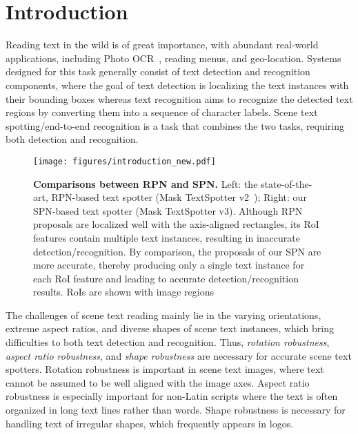 \documentclass[runningheads]{llncs}
\begin{document}
\section{Introduction}\label{sec:introduction}
Reading text in the wild is of great importance, with abundant real-world applications, including Photo OCR~\cite{bissacco2013photoocr}, reading menus, and geo-location. Systems designed for this task generally consist of text detection and recognition components, where the goal of text detection is localizing the text instances with their bounding boxes whereas text recognition aims to recognize the detected text regions by converting them into a sequence of character labels. Scene text spotting/end-to-end recognition is a task that combines the two tasks, requiring both detection and recognition.

\begin{figure}[t]
\centering
\texttt{[image: figures/introduction\_new.pdf]}
\caption{\textbf{Comparisons between RPN and SPN.} Left: the state-of-the-art, RPN-based text spotter (Mask TextSpotter v2~\cite{liao2019mask}); Right: our SPN-based text spotter (Mask TextSpotter v3). Although RPN proposals are localized well with the axis-aligned rectangles, its RoI features contain multiple text instances, resulting in inaccurate detection/recognition. By comparison, the proposals of our SPN are more accurate, thereby producing only a single text instance for each RoI feature and leading to accurate detection/recognition results. RoIs are shown with image regions}
\label{fig:introduction}
\end{figure}

The challenges of scene text reading mainly lie in the varying orientations, extreme aspect ratios, and diverse shapes of scene text instances, which bring difficulties to both text detection and recognition. Thus, \emph{rotation robustness}, \emph{aspect ratio robustness}, and \emph{shape robustness} are necessary for accurate scene text spotters. Rotation robustness is important in scene text images, where text cannot be assumed to be well aligned with the image axes. Aspect ratio robustness is especially important for non-Latin scripts where the text is often organized in long text lines rather than words. Shape robustness is necessary for handling text of irregular shapes, which frequently appears in logos.
\end{document}
